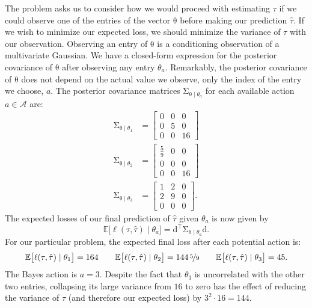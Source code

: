 \documentclass{article}
\newcommand{\given}{\mid}
\newcommand{\mc}[1]{\mathcal{#1}}
\newcommand{\trans}{^\top}
\newcommand{\mat}[1]{\bm{\mathrm{#1}}}
\renewcommand{\vec}[1]{\bm{\mathrm{#1}}}
\begin{document}
The problem asks us to consider how we would proceed with estimating
$\tau$ if we could observe one of the entries of the vector
$\vec{\theta}$ before making our prediction $\hat{\tau}$.  If we wish
to minimize our expected loss, we should minimize the variance of
$\tau$ with our observation.  Observing an entry of $\vec{\theta}$ is
a conditioning observation of a multivariate Gaussian.  We have a
closed-form expression for the posterior covariance of $\vec{\theta}$
after observing any entry $\theta_a$.  Remarkably, the posterior
covariance of $\vec{\theta}$ does not depend on the actual value we
observe, only the index of the entry we choose, $a$.  The posterior
covariance matrices $\mat{\Sigma}_{\vec{\theta} \given \theta_a}$ for
each available action $a \in \mc{A}$ are:
\begin{align*}
  \mat{\Sigma}_{\vec{\theta} \given \theta_1}
  &=
  \begin{bmatrix}
    0 & 0 & 0   \\
    0 & 5 & 0   \\
    0 & 0 & 16
  \end{bmatrix}
  \\
  \mat{\Sigma}_{\vec{\theta} \given \theta_2}
  &=
  \begin{bmatrix}
    \frac{5}{9} & 0 & 0   \\
    0           & 0 & 0   \\
    0           & 0 & 16
  \end{bmatrix}
  \\
  \mat{\Sigma}_{\vec{\theta} \given \theta_3}
  &=
  \begin{bmatrix}
    1 & 2 & 0 \\
    2 & 9 & 0 \\
    0 & 0 & 0
  \end{bmatrix}.
\end{align*}
The expected losses of our final prediction of $\hat{\tau}$
given $\theta_a$ is now given by
\begin{equation*}
  \mathbb{E}\bigl[\ell(\tau, \hat{\tau}) \given \theta_a \bigr]
  =
  \vec{d}\trans \mat{\Sigma}_{\vec{\theta} \given \theta_a} \vec{d}.
\end{equation*}
For our particular problem, the expected final loss after each potential
action is:
\begin{equation*}
  \mathbb{E}\bigl[\ell(\tau, \hat{\tau}) \given \theta_1\bigr]
  =
  164 \qquad
  \mathbb{E}\bigl[\ell(\tau, \hat{\tau}) \given \theta_2\bigr]
  =
  144\,\nicefrac{5}{9} \qquad
  \mathbb{E}\bigl[\ell(\tau, \hat{\tau}) \given \theta_3\bigr]
  =
  45.
\end{equation*}
The Bayes action is $a = 3$.  Despite the fact that $\theta_3$ is
uncorrelated with the other two entries, collapsing its large variance
from $16$ to zero has the effect of reducing the variance of $\tau$
(and therefore our expected loss) by $3^2 \cdot 16 = 144$.
\end{document}
